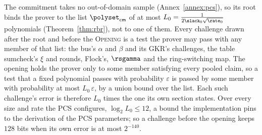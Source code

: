 The commitment takes no out-of-domain sample (Annex~\ref{annex:pcs}), so its root binds the prover to the list $\polyset_{\mathsf{cm}}$ of at most $L_0=\tfrac{1}{2\slack_0\sqrt{\rate_0}}$ polynomials (Theorem~\ref{thm:rbr}), not to one of them. Every challenge drawn after the root and before the \textsc{Opening} is a test the prover may pass with any member of that list: the bus's $\alpha$ and $\beta$ and its GKR's challenges, the table sumcheck's $\xi$ and rounds, Flock's, $\rsgamma$ and the ring-switching map. The opening holds the prover only to some member satisfying every pooled claim, so a test that a fixed polynomial passes with probability $\varepsilon$ is passed by some member with probability at most $L_0\,\varepsilon$, by a union bound over the list. Each such challenge's error is therefore $L_0$ times the one its own section states. Over every size and rate the PCS configures, $\log_2L_0\le12$, a bound the implementation pins to the derivation of the PCS parameters; so a challenge before the opening keeps $128$ bits when its own error is at most $2^{-140}$.

